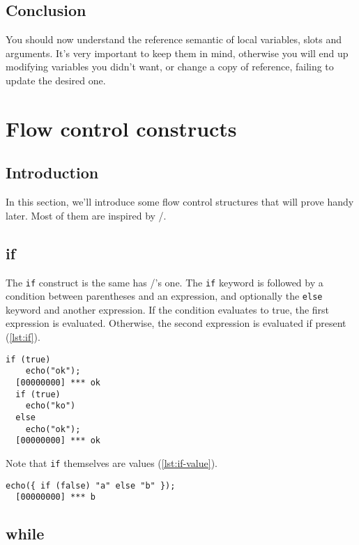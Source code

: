 \documentclass[openright,twoside,12pt]{report}
\begin{document}
\section{Conclusion}

You should now understand the reference semantic of local variables,
slots and arguments. It's very important to keep them in mind,
otherwise you will end up modifying variables you didn't want, or
change a copy of reference, failing to update the desired one.

\chapter{Flow control constructs}

\section{Introduction}

In this section, we'll introduce some flow control structures that
will prove handy later. Most of them are inspired by \C/\Cxx.

\section{if}

The \texttt{if} construct is the same has \C/\Cxx's one. The
\texttt{if} keyword is followed by a condition between parentheses and
an expression, and optionally the \texttt{else} keyword and another
expression. If the condition evaluates to true, the first expression
is evaluated. Otherwise, the second expression is evaluated if
present (\autoref{lst:if}).

\begin{lstlisting}[caption=The \texttt{if} construct, label=lst:if]
  if (true)
    echo("ok");
  [00000000] *** ok
  if (true)
    echo("ko")
  else
    echo("ok");
  [00000000] *** ok
\end{lstlisting}

Note that \lstinline|if| themselves are values (\autoref{lst:if-value}).

\begin{lstlisting}[caption=\texttt{if} are values, label=lst:if-value]
  echo({ if (false) "a" else "b" });
  [00000000] *** b
\end{lstlisting}

\section{while}
\end{document}
